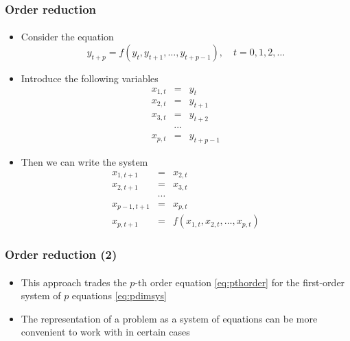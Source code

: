\documentclass[10pt,usenames,dvipsnames]{beamer}
\theoremstyle{definition}
\begin{document}
\begin{frame}[fragile]
	\frametitle{Order reduction}
	\framesubtitle{}
		\begin{itemize}
		\item Consider the equation \begin{equation}
			y_{t+p} = f(y_{t}, y_{t+1}, \ldots, y_{t+p-1}), \quad t = 0, 1, 2, \ldots
			\label{eq:pthorder}
		\end{equation} 
		\item Introduce the following variables
		\[
		\begin{array}{lll}
			x_{1,t} & = & y_t\\
			x_{2,t} & = & y_{t+1}\\
			x_{3,t} & = & y_{t+2}\\
			& \cdots &\\
			x_{p,t} & = & y_{t+p-1}
		\end{array}
		\]
		\item Then we can write the system
		\begin{equation}
					\begin{array}{lll}
				x_{1,t+1} & = & x_{2,t}\\
				x_{2,t+1} & = & x_{3,t}\\
				& \cdots &\\
				x_{p-1,t+1} & = & x_{p,t}\\
				x_{p,t+1} & = & f(x_{1,t},x_{2,t},\ldots,x_{p,t})
			\end{array}
			\label{eq:pdimsys}
		\end{equation}
	\end{itemize}
\end{frame}

\begin{frame}[fragile]
	\frametitle{Order reduction (2)}
	\framesubtitle{}
	\begin{itemize}
		\item This approach trades the $p$-th order equation \eqref{eq:pthorder} for the first-order system of $p$ equations \eqref{eq:pdimsys}
		\item The representation of a problem as a system of equations can be more convenient to work with in certain cases
	\end{itemize}
\end{frame}
\end{document}
